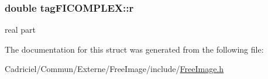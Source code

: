 \hypertarget{structtag_f_i_c_o_m_p_l_e_x_a448818f3de56c81064bdcb1ba78a7ead}{
\subsubsection[{r}]{\setlength{\rightskip}{0pt plus 5cm}double tag\-F\-I\-C\-O\-M\-P\-L\-E\-X\-::r}}\label{structtag_f_i_c_o_m_p_l_e_x_a448818f3de56c81064bdcb1ba78a7ead}


real part 



The documentation for this struct was generated from the following file\-:\begin{DoxyCompactItemize}
\item 
Cadriciel/\-Commun/\-Externe/\-Free\-Image/include/\hyperlink{_free_image_8h}{Free\-Image.\-h}\end{DoxyCompactItemize}
